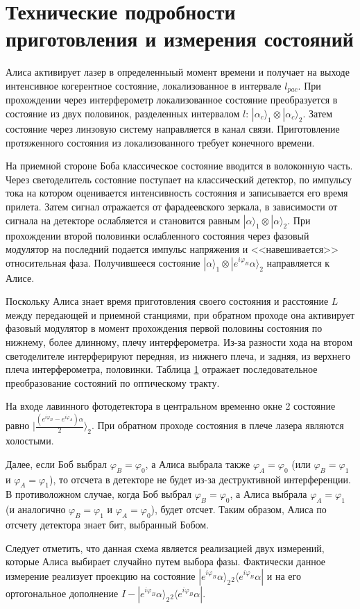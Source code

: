 \section[Технические подробности]{Технические подробности приготовления и измерения состояний}
Алиса активирует лазер в определенныый момент времени и получает на выходе интенсивное когерентное состояние, локализованное в интервале $l_{pac}$. 
При прохождении через интерферометр локализованное состояние преобразуется в состояние из двух половинок, разделенных интервалом $l$: $|\alpha_c\rangle_1 \otimes |\alpha_c\rangle_2$. 
Затем состояние через линзовую систему направляется в канал связи. Приготовление протяженного состояния из локализованного требует конечного времени.

На приемной стороне Боба классическое состояние вводится в волоконную часть. 
Через светоделитель состояние поступает на классический детектор, по импульсу тока на котором оценивается интенсивность состояния и записывается его время прилета. 
Затем сигнал отражается от фарадеевского зеркала, в зависимости от сигнала на детекторе ослабляется и становится равным $|\alpha\rangle_1 \otimes |\alpha\rangle_2$.
При прохождении второй половинки ослабленного состояния через фазовый модулятор на последний подается импульс напряжения и <<навешивается>> относительная фаза.
Получившееся состояние $|\alpha\rangle_1 \otimes |e^{i\varphi_B}\alpha\rangle_2$ направляется к Алисе.

Поскольку Алиса знает время приготовления своего состояния и расстояние $L$ между передающей и приемной станциями, при обратном проходе она активирует фазовый модулятор в момент прохождения первой половины состояния по нижнему, более длинному, плечу интерферометра. 
Из-за разности хода на втором светоделителе интерферируют передняя, из нижнего плеча, и задняя, из верхнего плеча интерферометра, половинки.
Таблица \ref{} отражает последовательное преобразование состояний по оптическому тракту.

На входе лавинного фотодетектора в центральном временно окне 2 состояние равно $|\frac{(e^{i\varphi_B} - e^{i\varphi_A})\alpha}{2}\rangle_2$.
При обратном проходе состояния в плече лазера являются холостыми.

Далее, если Боб выбрал $\varphi_B = \varphi_0$, а Алиса выбрала также $\varphi_A = \varphi_0$ (или $\varphi_B = \varphi_1$ и $\varphi_A = \varphi_1$), то отсчета в детекторе не будет из-за деструктивной интерференции.
В противоложном случае, когда Боб выбрал $\varphi_B = \varphi_0$, а Алиса выбрала $\varphi_A = \varphi_1$ (и аналогично $\varphi_B = \varphi_1$ и $\varphi_A = \varphi_0$), будет отсчет.
Таким образом, Алиса по отсчету детектора знает бит, выбранный Бобом.

Следует отметить, что данная схема является реализацией двух измерений, которые Алиса выбирает случайно путем выбора фазы. 
Фактически данное измерение реализует проекцию на состояние $|e^{i\varphi_B}\alpha\rangle_2 {}_2 \langle e^{i\varphi_B}\alpha|$ и на его ортогональное дополнение $I - |e^{i\varphi_B}\alpha\rangle_2 {}_2 \langle e^{i\varphi_B}\alpha|$.